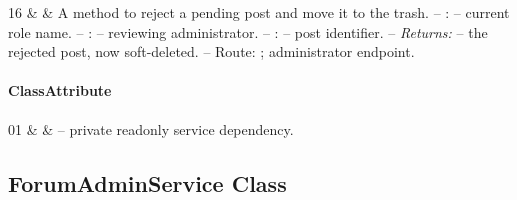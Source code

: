 \begin{ClassMethodTable}
16 & \newline{}\newline{} &
A method to reject a pending post and move it to the trash.
\newline -- :  -- current role name.
\newline -- :  -- reviewing administrator.
\newline -- :  -- post identifier.
\newline -- \textit{Returns:}  -- the rejected post, now soft-deleted.
\newline -- Route: ; administrator endpoint. \\ \hline
\end{ClassMethodTable}

\paragraph{ClassAttribute}
\begin{ClassAttributeTable}
01 &  &  -- private readonly service dependency. \\ \hline
\end{ClassAttributeTable}

\subsection{ForumAdminService Class}

